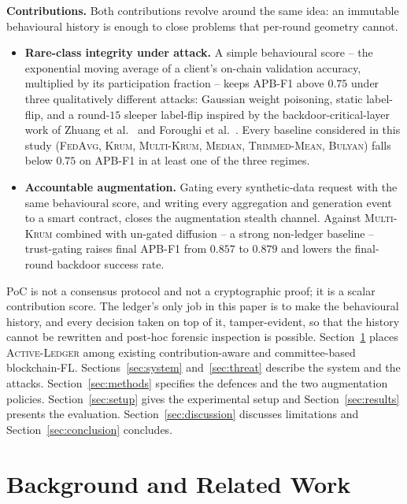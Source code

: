 \documentclass[runningheads]{llncs}
\newcommand{\fedavg}{\textsc{FedAvg}\xspace}
\newcommand{\krum}{\textsc{Krum}\xspace}
\newcommand{\mkrum}{\textsc{Multi-Krum}\xspace}
\newcommand{\median}{\textsc{Median}\xspace}
\newcommand{\tmean}{\textsc{Trimmed-Mean}\xspace}
\newcommand{\bulyan}{\textsc{Bulyan}\xspace}
\newcommand{\actledger}{\textsc{Active-Ledger}\xspace}
\begin{document}
\medskip
\noindent
\textbf{Contributions.} Both contributions revolve around the same
idea: an immutable behavioural history is enough to close problems
that per-round geometry cannot.
\begin{itemize}
\item \textbf{Rare-class integrity under attack.} A simple
behavioural score -- the exponential moving average of a client's
on-chain validation accuracy, multiplied by its participation
fraction -- keeps APB-F1 above $0.75$ under three qualitatively
different attacks: Gaussian weight poisoning, static label-flip, and
a round-$15$ sleeper label-flip inspired by the backdoor-critical-layer
work of Zhuang et al.~\cite{zhuang2024bclayers} and Foroughi et
al.~\cite{foroughi2026lsa}. Every baseline considered in this study
(\fedavg, \krum, \mkrum, \median, \tmean, \bulyan) falls below
$0.75$ on APB-F1 in at least one of the three regimes.
\item \textbf{Accountable augmentation.} Gating every synthetic-data
request with the same behavioural score, and writing every
aggregation and generation event to a smart contract, closes the
augmentation stealth channel. Against \mkrum combined with un-gated
diffusion -- a strong non-ledger baseline -- trust-gating raises
final APB-F1 from $0.857$ to $0.879$ and lowers the final-round
backdoor success rate.
\end{itemize}

PoC is not a consensus protocol and not a cryptographic proof;
it is a scalar contribution score. The ledger's only job in this
paper is to make the behavioural history, and every decision taken on
top of it, tamper-evident, so that the history cannot be rewritten and
post-hoc forensic inspection is possible. Section~\ref{sec:related}
places \actledger among existing contribution-aware and
committee-based blockchain-FL. Sections~\ref{sec:system}
and~\ref{sec:threat} describe the system and the attacks.
Section~\ref{sec:methods} specifies the defences and the two
augmentation policies. Section~\ref{sec:setup} gives the experimental
setup and Section~\ref{sec:results} presents the evaluation.
Section~\ref{sec:discussion} discusses limitations and
Section~\ref{sec:conclusion} concludes.

\section{Background and Related Work}
\label{sec:related}
\end{document}
